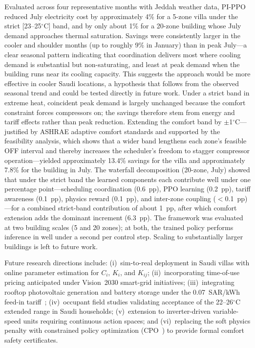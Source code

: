 \documentclass[12pt,a4paper]{article}
\begin{document}
Evaluated across four representative months with Jeddah weather data, PI-PPO reduced July electricity cost by approximately 4\% for a 5-zone villa under the strict [23--25$^\circ$C] band, and by only about 1\% for a 20-zone building whose July demand approaches thermal saturation. Savings were consistently larger in the cooler and shoulder months (up to roughly 9\% in January) than in peak July---a clear seasonal pattern indicating that coordination delivers most where cooling demand is substantial but non-saturating, and least at peak demand when the building runs near its cooling capacity. This suggests the approach would be more effective in cooler Saudi locations, a hypothesis that follows from the observed seasonal trend and could be tested directly in future work. Under a strict band in extreme heat, coincident peak demand is largely unchanged because the comfort constraint forces compressors on; the savings therefore stem from energy and tariff effects rather than peak reduction. Extending the comfort band by $\pm$1$^\circ$C---justified by ASHRAE adaptive comfort standards and supported by the feasibility analysis, which shows that a wider band lengthens each zone's feasible OFF interval and thereby increases the scheduler's freedom to stagger compressor operation---yielded approximately 13.4\% savings for the villa and approximately 7.8\% for the building in July. The waterfall decomposition (20-zone, July) showed that under the strict band the learned components each contribute well under one percentage point---scheduling coordination (0.6~pp), PPO learning (0.2~pp), tariff awareness (0.1~pp), physics reward (0.1~pp), and inter-zone coupling ($<$0.1~pp)---for a combined strict-band contribution of about 1~pp, after which comfort extension adds the dominant increment (6.3~pp). The framework was evaluated at two building scales (5 and 20 zones); at both, the trained policy performs inference in well under a second per control step. Scaling to substantially larger buildings is left to future work.

Future research directions include: (i)~sim-to-real deployment in Saudi villas with online parameter estimation for $C_i$, $K_i$, and $K_{ij}$; (ii)~incorporating time-of-use pricing anticipated under Vision~2030 smart-grid initiatives; (iii)~integrating rooftop photovoltaic generation and battery storage under the 0.07~SAR/kWh feed-in tariff~\cite{ref16}; (iv)~occupant field studies validating acceptance of the 22--26$^\circ$C extended range in Saudi households; (v)~extension to inverter-driven variable-speed units requiring continuous action spaces; and (vi)~replacing the soft physics penalty with constrained policy optimization (CPO~\cite{ref37}) to provide formal comfort safety certificates.
\end{document}
